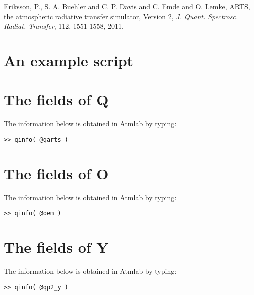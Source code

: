 \documentclass[a4paper,11pt]{article}
\begin{document}
\noindent
Eriksson, P., S. A. Buehler and C. P. Davis and C. Emde and O. Lemke, 
ARTS, the atmospheric radiative transfer simulator, Version 2, 
{\it J. Quant. Spectrosc. Radiat. Transfer}, 112, 1551-1558, 2011.





\appendix

\newpage{}

\newpage
\section{An example script}
\label{app:qfun}
%



\newpage
\section{The fields of Q}
\label{app:q}
%
The information below is obtained in Atmlab by typing:
\begin{verbatim}
>> qinfo( @qarts )
\end{verbatim}
\vspace{2ex}



\newpage
\section{The fields of O}
\label{app:o}
%
The information below is obtained in Atmlab by typing:
\begin{verbatim}
>> qinfo( @oem )
\end{verbatim}
\vspace{2ex}



\newpage
\section{The fields of Y}
\label{app:y}
%
The information below is obtained in Atmlab by typing:
\begin{verbatim}
>> qinfo( @qp2_y )
\end{verbatim}
\vspace{2ex}

\end{document}
